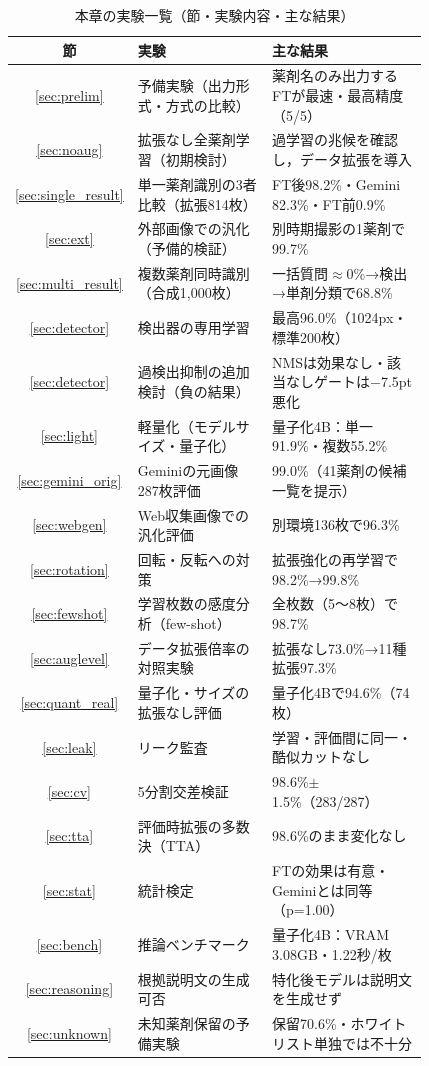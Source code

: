 \documentclass[dvipdfmx]{jsarticle}
\begin{document}
\begin{table}[htbp]
\centering
\caption{本章の実験一覧（節・実験内容・主な結果）}
\label{tab:exp_list}
\small
\setlength{\tabcolsep}{4pt}
\begin{tabular}{cp{0.40\linewidth}p{0.42\linewidth}}
\hline
節 & 実験 & 主な結果 \\
\hline
\ref{sec:prelim} & 予備実験（出力形式・方式の比較） & 薬剤名のみ出力するFTが最速・最高精度（5/5） \\
\ref{sec:noaug} & 拡張なし全薬剤学習（初期検討） & 過学習の兆候を確認し，データ拡張を導入 \\
\ref{sec:single_result} & 単一薬剤識別の3者比較（拡張814枚） & FT後98.2\%・Gemini 82.3\%・FT前0.9\% \\
\ref{sec:ext} & 外部画像での汎化（予備的検証） & 別時期撮影の1薬剤で99.7\% \\
\ref{sec:multi_result} & 複数薬剤同時識別（合成1,000枚） & 一括質問$\approx$0\%→検出→単剤分類で68.8\% \\
\ref{sec:detector} & 検出器の専用学習 & 最高96.0\%（1024px・標準200枚） \\
\ref{sec:detector} & 過検出抑制の追加検討（負の結果） & NMSは効果なし・該当なしゲートは$-$7.5pt悪化 \\
\ref{sec:light} & 軽量化（モデルサイズ・量子化） & 量子化4B：単一91.9\%・複数55.2\% \\
\ref{sec:gemini_orig} & Geminiの元画像287枚評価 & 99.0\%（41薬剤の候補一覧を提示） \\
\ref{sec:webgen} & Web収集画像での汎化評価 & 別環境136枚で96.3\% \\
\ref{sec:rotation} & 回転・反転への対策 & 拡張強化の再学習で98.2\%→99.8\% \\
\ref{sec:fewshot} & 学習枚数の感度分析（few-shot） & 全枚数（5〜8枚）で98.7\% \\
\ref{sec:auglevel} & データ拡張倍率の対照実験 & 拡張なし73.0\%→11種拡張97.3\% \\
\ref{sec:quant_real} & 量子化・サイズの拡張なし評価 & 量子化4Bで94.6\%（74枚） \\
\ref{sec:leak} & リーク監査 & 学習・評価間に同一・酷似カットなし \\
\ref{sec:cv} & 5分割交差検証 & 98.6\%$\pm$1.5\%（283/287） \\
\ref{sec:tta} & 評価時拡張の多数決（TTA） & 98.6\%のまま変化なし \\
\ref{sec:stat} & 統計検定 & FTの効果は有意・Geminiとは同等（p=1.00） \\
\ref{sec:bench} & 推論ベンチマーク & 量子化4B：VRAM 3.08GB・1.22秒/枚 \\
\ref{sec:reasoning} & 根拠説明文の生成可否 & 特化後モデルは説明文を生成せず \\
\ref{sec:unknown} & 未知薬剤保留の予備実験 & 保留70.6\%・ホワイトリスト単独では不十分 \\
\hline
\end{tabular}
\end{table}
\end{document}
